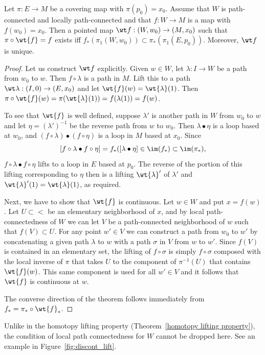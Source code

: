 \begin{thm}\label{Lifting Theorem}
    Let $\pi:E\to M$ be a covering map with $\pi (p_0)=x_0$. Assume that $W$ is path-connected and locally path-connected and that $f:W\to M$ is a map with $f(w_0)=x_0$. Then a pointed map $\wt f:(W,w_0)\to (M,x_0)$ such that $\pi\circ\wt{f}=f$ exists iff $f_\ast (\pi_1(W,w_0))\subset \pi_\ast (\pi_1(E,p_0))$. Moreover, $\wt f$ is unique.
\end{thm}
\begin{proof}
    Let us construct $\wt f$ explicitly. Given $w\in W$, let $\lambda:I\to W$ be a path from $w_0$ to $w$. Then $f\circ \lambda$ is a path in $M$. Lift this to a path $\wt\lambda:(I,0)\to (E,x_0)$ and let $\wt{f}(w)=\wt{\lambda}(1)$. Then $\pi\circ \wt{f}(w)=\pi(\wt{\lambda}(1))=f(\lambda(1))=f(w)$.

    To see that $\wt{f}$ is well defined, suppose $\lambda'$ is another path in $W$ from $w_0$ to $w$ and let $\eta=(\lambda ')^{-1}$ be the reverse path from $w$ to $w_0$. Then $\lambda\bullet \eta$ is a loop based at $w_0$, and $(f\circ \lambda)\bullet (f\circ\eta)$ is a loop in $M$ based at $x_0$. Since 
    \[[f\circ\lambda \bullet f\circ\eta]=f_\ast([\lambda\bullet\eta]\in \im(f_\ast)\subset \im(\pi_\ast),\]
    $f\circ\lambda\bullet f\circ\eta$ lifts to a loop in $E$ based at $p_0$. The reverse of the portion of this lifting corresponding to $\eta$ then is a lifting $\wt{\lambda}'$ of $\lambda '$ and $\wt{\lambda}'(1)=\wt{\lambda}(1)$, as required.

    Next, we have to show that $\wt{f}$ is continuous. Let $w\in W$  and put $x=f(w)$. Let $U\subset <$ be an elementary neighborhood of $x$, and by local path-connectedness of $W$ we can let $V$ be a path-connected neighborhood of $w$ such that $f(V)\subset U$. For any point $w'\in V$ we can construct a path from $w_0$ to $w'$ by concatenating a given path $\lambda$ to $w$ with a path $\sigma$ in $V$ from $w$ to $w'$. Since $f(V)$ is contained in an elementary set, the lifting of $f\circ \sigma$ is simply $f\circ\sigma$ composed with the local inverse of $\pi$ that takes $U$ to the component of $\pi^{-1}(U)$ that contains $\wt{f}(w)$. This same component is used for all $w'\in V$ and it follows that $\wt{f}$ is continuous at $w$.

    The converse direction of the theorem follows immediately from $f_\ast=\pi_\ast\circ \wt{f}_\ast$.
\end{proof}
\begin{rem}
    Unlike in the homotopy lifting property (Theorem~\ref{homotopy lifting property}), the condition of local path connectedness for $W$ cannot be dropped here. See an example in Figure~\ref{fig:discont_lift}.
\end{rem}

